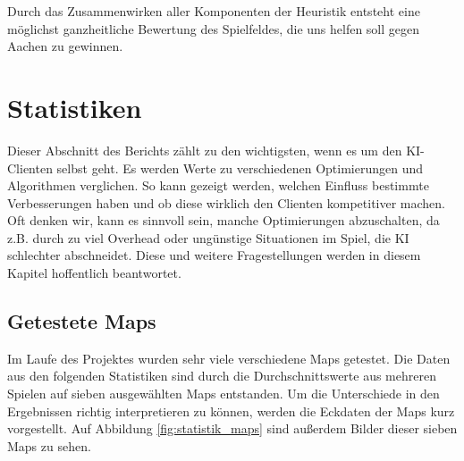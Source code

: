 \documentclass[12pt,a4paper,bibliography=totocnumbered,listof=totocnumbered]{scrartcl}
\begin{document}
	Durch das Zusammenwirken aller Komponenten der Heuristik entsteht eine möglichst ganzheitliche Bewertung des Spielfeldes, die uns helfen soll gegen Aachen zu gewinnen.

    \newpage
    \section{Statistiken}
    \vspace{1em}
	Dieser Abschnitt des Berichts zählt zu den wichtigsten, wenn es um den KI-Clienten selbst geht. Es werden Werte zu verschiedenen Optimierungen und Algorithmen verglichen. So kann gezeigt werden, welchen Einfluss bestimmte \grqq Verbesserungen\glqq{} haben und ob diese wirklich den Clienten kompetitiver machen. Oft denken wir, kann es sinnvoll sein, manche Optimierungen abzuschalten, da z.B. durch zu viel Overhead oder ungünstige Situationen im Spiel, die KI schlechter abschneidet. Diese und weitere Fragestellungen werden in diesem Kapitel hoffentlich beantwortet.\newline

	\subsection{Getestete Maps}
	\vspace{1em}
	Im Laufe des Projektes wurden sehr viele verschiedene Maps getestet. Die Daten aus den folgenden Statistiken sind durch die Durchschnittswerte aus mehreren Spielen auf sieben ausgewählten Maps entstanden. Um die Unterschiede in den Ergebnissen richtig interpretieren zu können, werden die Eckdaten der Maps kurz vorgestellt. Auf Abbildung \ref{fig:statistik_maps} sind außerdem Bilder dieser sieben Maps zu sehen.
	
\end{document}
